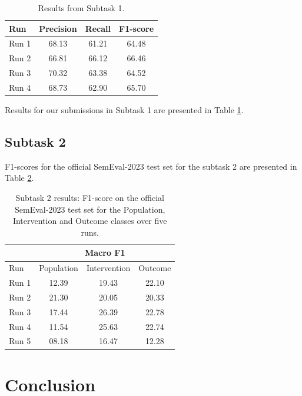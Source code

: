 \documentclass[11pt]{article}
\begin{document}
\begin{table}[ht]
    \centering
    \begin{tabular}{lccc}
        \toprule
        Run & Precision & Recall & F1-score \\
        \midrule
        Run 1 & 68.13 & 61.21 & 64.48 \\
        Run 2 & 66.81 & 66.12 & 66.46 \\
        Run 3 & 70.32 & 63.38 & 64.52 \\
        Run 4 & 68.73 & 62.90 & 65.70 \\
        \bottomrule
    \end{tabular}
    \caption{Results from Subtask 1.}
    \label{tab:task_1}
\end{table}

Results for our submissions in Subtask 1 are presented in Table \ref{tab:task_1}.
%
%
%
\subsection{Subtask 2}
\label{res:task2}
%
F1-scores for the official SemEval-2023 test set for the subtask 2 are presented in Table \ref{tab:task_2}.

%
\begin{table}[ht]
    \centering
    \begin{tabular}{lccc}
        \toprule
          & \multicolumn{3}{c}{Macro F1} \\
         \hline
        Run & Population & Intervention & Outcome \\
        \midrule
        Run 1 & 12.39 & 19.43 & 22.10 \\
        Run 2 & 21.30 & 20.05 & 20.33 \\
        Run 3 & 17.44 & 26.39 & 22.78 \\
        Run 4 & 11.54 & 25.63 & 22.74 \\
        Run 5 & 08.18 & 16.47 & 12.28 \\
        \bottomrule
    \end{tabular}
    \caption{Subtask 2 results: F1-score on the official SemEval-2023 test set for the Population, Intervention and Outcome classes over five runs.}
    \label{tab:task_2}
\end{table}


\section{Conclusion}


\end{document}
